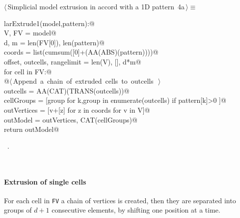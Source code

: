 \documentclass[11pt,oneside]{article}	%
\begin{document}
\begin{flushleft} \small
\begin{minipage}{\linewidth} \label{scrap1}
\protect{}$\langle\,$Simplicial model extrusion in accord with a 1D pattern\nobreak\ {\footnotesize 4a}$\,\rangle\equiv$
\vspace{-1ex}
\begin{list}{}{} \item
\mbox{}\verb@def larExtrude1(model,pattern):@\\
\mbox{}\verb@    V, FV = model@\\
\mbox{}\verb@    d, m = len(FV[0]), len(pattern)@\\
\mbox{}\verb@    coords = list(cumsum([0]+(AA(ABS)(pattern))))@\\
\mbox{}\verb@    offset, outcells, rangelimit = len(V), [], d*m@\\
\mbox{}\verb@    for cell in FV:@\\
\mbox{}\verb@        @\hbox{$\langle\,$Append a chain of extruded cells to outcells\nobreak\ {\footnotesize {}}$\,\rangle$}\verb@@\\
\mbox{}\verb@    outcells = AA(CAT)(TRANS(outcells))@\\
\mbox{}\verb@    cellGroups = [group for k,group in enumerate(outcells) if pattern[k]>0 ]@\\
\mbox{}\verb@    outVertices = [v+[z] for z in coords for v in V]@\\
\mbox{}\verb@    outModel = outVertices, CAT(cellGroups)@\\
\mbox{}\verb@    return outModel@\\
\mbox{}\verb@@{\NWsep}
\end{list}
\vspace{-1ex}
\footnotesize\addtolength{\baselineskip}{-1ex}
\begin{list}{}{\setlength{\itemsep}{-\parsep}\setlength{\itemindent}{-\leftmargin}}
\item \NWtxtMacroRefIn\ .
\end{list}
\end{minipage}\\[4ex]
\end{flushleft}

\paragraph{Extrusion of single cells}
For each cell in \texttt{FV} a chain of vertices is created, then they are separated into groups of $d+1$ consecutive elements, by shifting one position at a time.
\end{document}
